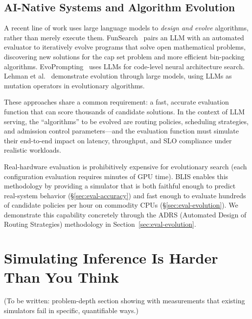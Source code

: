 \documentclass[11pt]{article}
\theoremstyle{plain} %
\theoremstyle{definition} %
\theoremstyle{remark} %
\numberwithin{equation}{section}
\begin{document}
\subsection{AI-Native Systems and Algorithm Evolution}
\label{subsec:bg-ainative}

A recent line of work uses large language models to \emph{design and evolve} algorithms, rather than merely execute them.
FunSearch~\cite{romeraparedes2024funsearch} pairs an LLM with an automated evaluator to iteratively evolve programs that solve open mathematical problems, discovering new solutions for the cap set problem and more efficient bin-packing algorithms.
EvoPrompting~\cite{chen2024evoprompting} uses LLMs for code-level neural architecture search.
Lehman et al.~\cite{lehman2023evolution} demonstrate evolution through large models, using LLMs as mutation operators in evolutionary algorithms.

These approaches share a common requirement: a fast, accurate evaluation function that can score thousands of candidate solutions.
In the context of LLM serving, the ``algorithms'' to be evolved are routing policies, scheduling strategies, and admission control parameters---and the evaluation function must simulate their end-to-end impact on latency, throughput, and SLO compliance under realistic workloads.

Real-hardware evaluation is prohibitively expensive for evolutionary search (each configuration evaluation requires minutes of GPU time).
BLIS enables this methodology by providing a simulator that is both faithful enough to predict real-system behavior (\S\ref{sec:eval-accuracy}) and fast enough to evaluate hundreds of candidate policies per hour on commodity CPUs (\S\ref{sec:eval-evolution}).
We demonstrate this capability concretely through the ADRS (Automated Design of Routing Strategies) methodology in Section~\ref{sec:eval-evolution}.


\section{Simulating Inference Is Harder Than You Think}
\label{sec:hard}

(To be written: problem-depth section showing with measurements that existing simulators fail in specific, quantifiable ways.)
\end{document}
